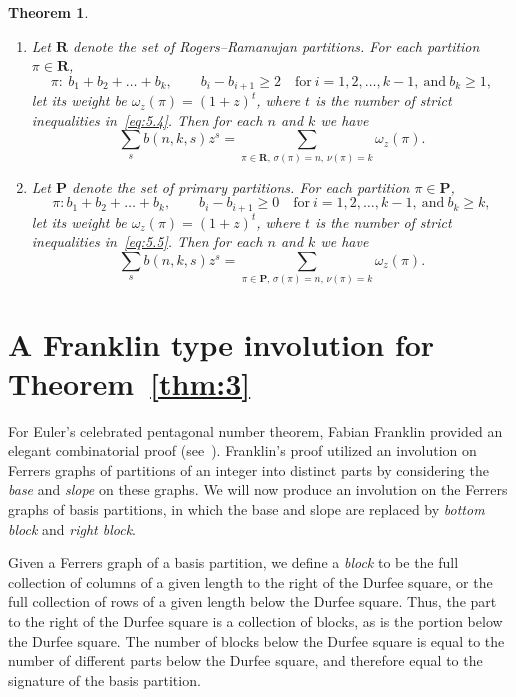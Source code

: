 \documentclass[pdftex]{sigma}
\numberwithin{equation}{section}
\newtheorem{Theorem}{Theorem}[section]
\theoremstyle{definition}
\begin{document}
\begin{Theorem}\label{thm:4}\quad
\begin{enumerate}\itemsep=0pt
\item[$(i)$]
Let $\mathbf{R}$ denote the set of Rogers--Ramanujan partitions. For
each partition $\pi\in \mathbf{R}$,
\begin{equation}
\pi\colon\ b_1+b_2+\dots +b_k, \qquad b_i-b_{i+1}\ge 2 \quad \text{for} \
i=1,2,\dots , k-1, \ \text{and} \ b_k\ge 1,\label{eq:5.4}
\end{equation}
let its weight be $\omega_z(\pi)=(1+z)^t$, where $t$ is the number of strict inequalities in~\eqref{eq:5.4}. Then for each $n$ and $k$ we have
\[
\sum_sb(n,k,s)z^s=\sum_{\pi\in \mathbf{R},\, \sigma(\pi)=n,\, \nu(\pi)=k}\omega_z(\pi).
\]
\item[$(ii)$]
Let $\mathbf{P}$ denote the set of primary partitions. For
each partition $\pi\in \mathbf{P}$,
\begin{equation}
\pi\colon b_1+b_2+\dots +b_k, \qquad b_i-b_{i+1}\ge 0 \quad \text{for} \
i=1,2,\dots , k-1, \ \text{and} \ b_k\ge k, \label{eq:5.5}
\end{equation}
let its weight be $\omega_z(\pi)=(1+z)^t$, where $t$ is the
number of strict inequalities in~\eqref{eq:5.5}. Then for each $n$ and $k$ we have
\[
\sum_sb(n,k,s)z^s=\sum_{\pi\in \mathbf{P},\, \sigma(\pi)=n,\, \nu(\pi)=k}\omega_z(\pi).
\]
\end{enumerate}
\end{Theorem}

\section{A Franklin type involution for Theorem~\ref{thm:3}}\label{section6}

For Euler's celebrated pentagonal number theorem, Fabian Franklin provided
an elegant combinatorial proof (see~\cite{An-book}). Franklin's proof utilized an
involution on Ferrers graphs of partitions of an integer into distinct
parts by considering the {\it base} and {\it slope} on these graphs.
We will now produce an involution on the Ferrers graphs of basis partitions,
in which the base and slope are replaced by {\it bottom block} and
{\it right block}.

Given a Ferrers graph of a basis partition, we define a {\it block} to be
the full collection of columns of a given length to the right of
the Durfee square, or the full collection of rows of a given length
below the Durfee square. Thus, the part to the right of the Durfee
square is a collection of blocks, as is the portion below the Durfee
square. The number of blocks below the Durfee square is equal to the
number of different parts below the Durfee square, and therefore equal
to the signature of the basis partition.
\end{document}
